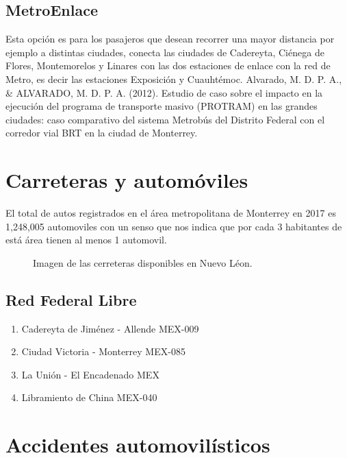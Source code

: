 \documentclass[a4paper]{article}
\begin{document}
\subsection{MetroEnlace}
Esta opción es para los pasajeros que desean recorrer una mayor distancia por ejemplo a distintas ciudades, conecta las ciudades de Cadereyta, Ciénega de Flores, Montemorelos y Linares con las dos estaciones de enlace con la red de Metro, es decir las estaciones Exposición y Cuauhtémoc. 
Alvarado, M. D. P. A., \& ALVARADO, M. D. P. A. (2012). Estudio de caso sobre el impacto en la ejecución del programa de transporte masivo (PROTRAM) en las grandes ciudades: caso comparativo del sistema Metrobús del Distrito Federal con el corredor vial BRT en la ciudad de Monterrey.

\autocite{Manchester}


\section{Carreteras y automóviles}
El total  de autos registrados en  el área metropolitana de Monterrey en 2017  es 1,248,005 automoviles con un senso que nos indica que por  cada 3 habitantes de está área tienen al menos 1 automovil.
\autocite{SCT}

\begin{figure}[H]
    \centering

    \caption{Imagen de las cerreteras disponibles en Nuevo Léon.\\\autocite{SCT}}
    \label{fig:Carreteras}
\end{figure}

\subsection{Red Federal Libre}
\begin{enumerate}
\item Cadereyta de Jiménez - Allende MEX-009 
\item Ciudad Victoria - Monterrey MEX-085
\item La Unión - El Encadenado MEX 
\item Libramiento de China MEX-040 
\end{enumerate}
\autocite{SCT}

\section{Accidentes automovilísticos}
\end{document}
